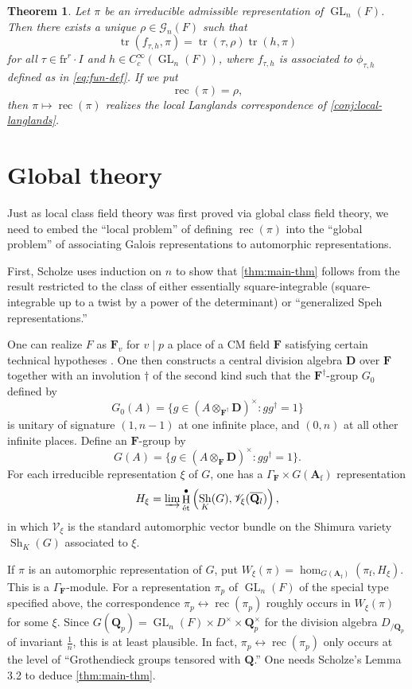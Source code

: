 \documentclass{article}
\DeclareMathOperator{\GL}{GL}
\DeclareMathOperator{\h}{H}
\DeclareMathOperator{\reciprocity}{rec}
\DeclareMathOperator{\shimura}{Sh}
\DeclareMathOperator{\trace}{tr}
\newcommand{\etale}{\textnormal{\'et}}
\newcommand{\finite}{\mathrm{f}}
\newcommand{\frob}{\mathrm{fr}} %
\newcommand{\cG}{\mathcal{G}}
\newcommand{\dA}{\mathbf{A}}
\newcommand{\dD}{\mathbf{D}}
\newcommand{\dF}{\mathbf{F}}
\newcommand{\dQ}{\mathbf{Q}}
\newcommand{\sV}{\mathscr{V}}
\newtheorem{theorem}[subsection]{Theorem}
\begin{document}
\begin{theorem}\label{thm:main-thm}
Let $\pi$ be an irreducible admissible representation of $\GL_n(F)$. Then there 
exists a unique $\rho\in \cG_n(F)$ such that 
\[
  \trace(f_{\tau,h},\pi) = \trace(\tau,\rho)\trace(h,\pi) 
\]
for all $\tau\in \frob^r\cdot I$ and $h\in C_c^\infty(\GL_n(F))$, where 
$f_{\tau,h}$ is associated to $\phi_{\tau,h}$ defined as in 
\eqref{eq:fun-def}. If we put 
\[
  \reciprocity(\pi) = \rho ,
\]
then $\pi\mapsto \reciprocity(\pi)$ realizes the local Langlands correspondence 
of \autoref{conj:local-langlands}. 
\end{theorem}





\section{Global theory}

Just as local class field theory was first proved via global class field 
theory, we need to embed the ``local problem'' of defining 
$\reciprocity(\pi)$ into the ``global problem'' of associating Galois 
representations to automorphic representations. 

First, Scholze uses induction on $n$ to show that \autoref{thm:main-thm} 
follows from the result restricted to the class of either essentially 
square-integrable (square-integrable up to a twist by a power of the 
determinant) or ``generalized Speh representations.'' 

One can realize $F$ as $\dF_v$ for $v\mid p$ a place of a CM field $\dF$ 
satisfying certain technical hypotheses \cite[\S 8]{scholze-2013}. One then 
constructs a central division algebra $\dD$ over $\dF$ together with an 
involution $\dagger$ of the second kind such that the $\dF^\dagger$-group 
$G_0$ defined by 
\[
  G_0(A) = \{g\in (A\otimes_{\dF^\dagger} \dD)^\times:g g^\dagger = 1\}
\]
is unitary of signature $(1,n-1)$ at one infinite place, and $(0,n)$ at all 
other infinite places. Define an $\dF$-group by 
\[
  G(A) = \{g\in (A\otimes_\dF \dD)^\times:g g^\dagger = 1\} .
\]
For each irreducible representation $\xi$ of $G$, one has a 
$\Gamma_\dF\times G(\dA_\finite)$ representation 
\[
  H_\xi = \varinjlim \h^\bullet_\etale\left(\shimura_K(G), \sV_\xi(\overline{\dQ_l})\right) ,
\]
in which $\sV_\xi$ is the standard automorphic vector bundle on the Shimura 
variety $\shimura_K(G)$ associated to $\xi$. 

If $\pi$ is an automorphic representation of $G$, put 
$W_\xi(\pi) = \hom_{G(\dA_\finite)}(\pi_\finite, H_\xi)$. This is a 
$\Gamma_\dF$-module. For a representation $\pi_p$ of $\GL_n(F)$ of the special 
type specified above, the correspondence 
$\pi_p\leftrightarrow \reciprocity(\pi_p)$ roughly occurs in 
$W_\xi(\pi)$ for some $\xi$. Since 
$G(\dQ_p) = \GL_n(F)\times D^\times \times \dQ_p^\times$ for the division 
algebra $D_{/\dQ_p}$ of invariant $\frac 1 n$, this is at least plausible. In 
fact, $\pi_p\leftrightarrow \reciprocity(\pi_p)$ only occurs at the level of 
``Grothendieck groups tensored with $\dQ$.'' One needs Scholze's Lemma 3.2 to 
deduce \autoref{thm:main-thm}. 





\printbibliography
\end{document}
